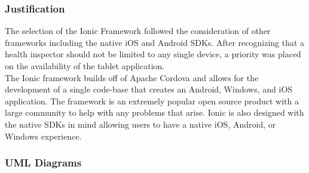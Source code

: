 \documentclass[twoside,letterpaper]{article}
\begin{document}
\subsubsection{Justification}
The selection of the Ionic Framework followed the consideration of other frameworks including the native iOS and Android SDKs. After recognizing that a health inspector should not be limited to any single device, a priority was placed on the availability of the tablet application.
\\
The Ionic framework builds off of Apache Cordova and allows for the development of a single code-base that creates an Android, Windows, and iOS application. The framework is an extremely popular open source product with a large community to help with any problems that arise. Ionic is also designed with the native SDKs in mind allowing users to have a native iOS, Android, or Windows experience.

\newpage
\subsubsection{UML Diagrams}
\end{document}
